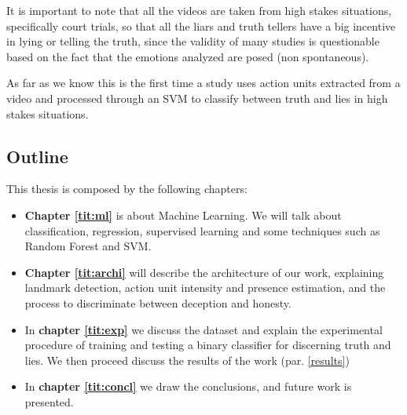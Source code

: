 It is important to note that all the videos are taken from high stakes situations, specifically court trials, so that all the liars and truth tellers have a big incentive in lying or telling the truth, since the validity of many studies is questionable based on the fact that the emotions analyzed are posed (non spontaneous). 

As far as we know this is the first time a study uses action units extracted from a video and processed through an SVM to classify between truth and lies in high stakes situations.

\subsection{Outline}
This thesis is composed by the following chapters:

\begin{itemize}
	\item \textbf{Chapter \ref{tit:ml}} is about Machine Learning. We will talk about classification, regression, supervised learning and some techniques such as Random Forest and SVM.
	\item \textbf{Chapter \ref{tit:archi}} will describe the architecture of our work, explaining landmark detection, action unit intensity and presence estimation, and the process to discriminate between deception and honesty.
	\item In \textbf{chapter \ref{tit:exp}} we discuss the dataset and explain the experimental procedure of training and testing a binary classifier for discerning truth and lies. We then proceed discuss the results of the work (par. \ref{results})
	\item In \textbf{chapter \ref{tit:concl}} we draw the conclusions, and future work is presented. 
\end{itemize}

